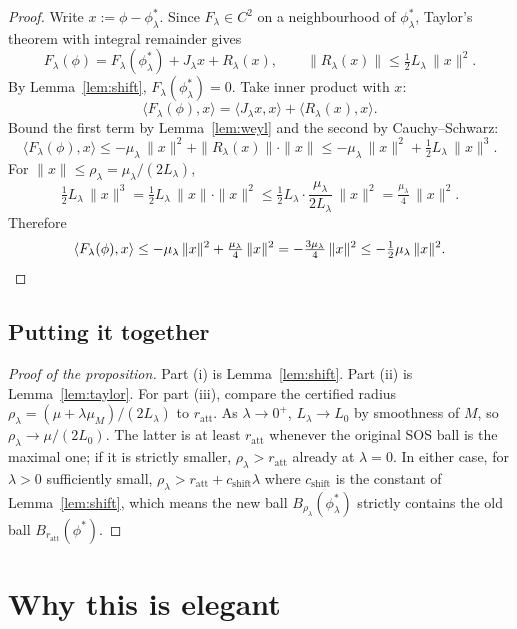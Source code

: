 \documentclass[11pt]{article}
\begin{document}
\begin{proof}
Write $x := \phi - \phi^*_\lambda$. Since $F_\lambda \in C^2$ on a neighbourhood of $\phi^*_\lambda$, Taylor's theorem with integral remainder gives
\[
F_\lambda(\phi) = F_\lambda(\phi^*_\lambda) + J_\lambda x + R_\lambda(x), \qquad \|R_\lambda(x)\| \le \tfrac{1}{2} L_\lambda\, \|x\|^2.
\]
By Lemma~\ref{lem:shift}, $F_\lambda(\phi^*_\lambda) = 0$. Take inner product with $x$:
\[
\langle F_\lambda(\phi), x\rangle = \langle J_\lambda x, x\rangle + \langle R_\lambda(x), x\rangle.
\]
Bound the first term by Lemma~\ref{lem:weyl} and the second by Cauchy--Schwarz:
\[
\langle F_\lambda(\phi), x\rangle \le -\mu_\lambda\, \|x\|^2 + \|R_\lambda(x)\| \cdot \|x\| \le -\mu_\lambda\, \|x\|^2 + \tfrac{1}{2} L_\lambda\, \|x\|^3.
\]
For $\|x\| \le \rho_\lambda = \mu_\lambda / (2 L_\lambda)$,
\[
\tfrac{1}{2} L_\lambda\, \|x\|^3 = \tfrac{1}{2} L_\lambda\, \|x\| \cdot \|x\|^2 \le \tfrac{1}{2} L_\lambda \cdot \frac{\mu_\lambda}{2 L_\lambda}\, \|x\|^2 = \tfrac{\mu_\lambda}{4}\, \|x\|^2.
\]
Therefore
\[
\langle F_\lambda(\phi), x\rangle \le -\mu_\lambda\, \|x\|^2 + \tfrac{\mu_\lambda}{4}\, \|x\|^2 = -\tfrac{3 \mu_\lambda}{4}\, \|x\|^2 \le -\tfrac{1}{2} \mu_\lambda\, \|x\|^2. \qedhere
\]
\end{proof}

\subsection{Putting it together}

\begin{proof}[Proof of the proposition]
Part (i) is Lemma~\ref{lem:shift}. Part (ii) is Lemma~\ref{lem:taylor}. For part (iii), compare the certified radius $\rho_\lambda = (\mu + \lambda \mu_M)/(2 L_\lambda)$ to $r_{\mathrm{att}}$. As $\lambda \to 0^+$, $L_\lambda \to L_0$ by smoothness of $M$, so $\rho_\lambda \to \mu/(2 L_0)$. The latter is at least $r_{\mathrm{att}}$ whenever the original SOS ball is the maximal one; if it is strictly smaller, $\rho_\lambda > r_{\mathrm{att}}$ already at $\lambda = 0$. In either case, for $\lambda > 0$ sufficiently small, $\rho_\lambda > r_{\mathrm{att}} + c_{\mathrm{shift}} \lambda$ where $c_{\mathrm{shift}}$ is the constant of Lemma~\ref{lem:shift}, which means the new ball $B_{\rho_\lambda}(\phi^*_\lambda)$ strictly contains the old ball $B_{r_{\mathrm{att}}}(\phi^*)$.
\end{proof}

\section{Why this is elegant}
\end{document}
